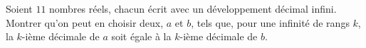 Soient $11$ nombres réels, chacun écrit avec un développement décimal
infini. Montrer qu'on peut en choisir deux, $a$ et $b$, tels que, pour une
infinité de rangs $k$, la $k$-ième décimale de $a$ soit égale à la $k$-ième
décimale de $b$.
